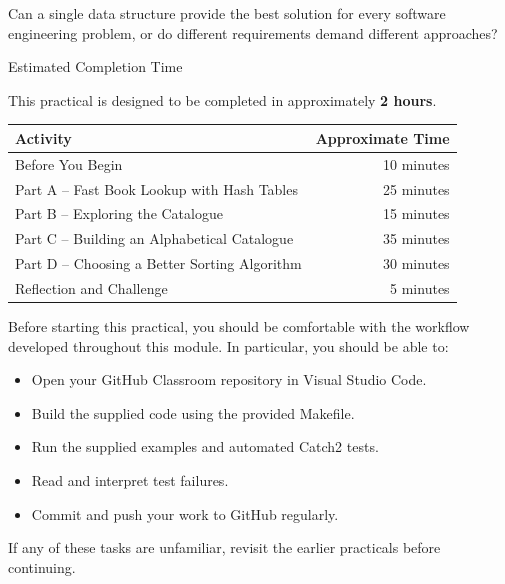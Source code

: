 \documentclass{csc2059practical}
\begin{document}
\begin{engineeringquestion}
Can a single data structure provide the best solution for every software engineering problem, or do different requirements demand different approaches?
\end{engineeringquestion}

\begin{infobox}{Estimated Completion Time}

This practical is designed to be completed in approximately \textbf{2 hours}.

\begin{center}
\begin{tabular}{lr}
\toprule
Activity & Approximate Time \\
\midrule
Before You Begin & 10 minutes \\
Part A -- Fast Book Lookup with Hash Tables & 25 minutes \\
Part B -- Exploring the Catalogue & 15 minutes \\
Part C -- Building an Alphabetical Catalogue & 35 minutes \\
Part D -- Choosing a Better Sorting Algorithm & 30 minutes \\
Reflection and Challenge & 5 minutes \\
\bottomrule
\end{tabular}
\end{center}

\end{infobox}


Before starting this practical, you should be comfortable with the workflow developed throughout this module. In particular, you should be able to:

\begin{itemize}
    \item Open your GitHub Classroom repository in Visual Studio Code.
    \item Build the supplied code using the provided Makefile.
    \item Run the supplied examples and automated Catch2 tests.
    \item Read and interpret test failures.
    \item Commit and push your work to GitHub regularly.
\end{itemize}

If any of these tasks are unfamiliar, revisit the earlier practicals before continuing.
\end{document}
